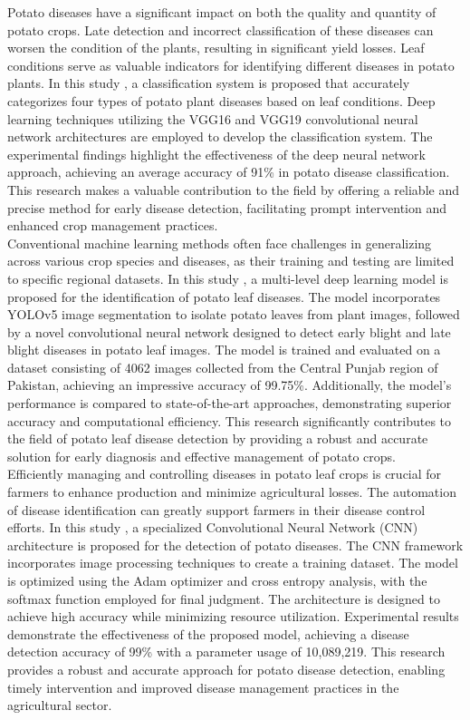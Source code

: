 \documentclass[conference]{IEEEtran}
\begin{document}
Potato diseases have a significant impact on both the quality and quantity of potato crops. Late detection and incorrect classification of these diseases can worsen the condition of the plants, resulting in significant yield losses. Leaf conditions serve as valuable indicators for identifying different diseases in potato plants. In this study \cite{9231784}, a classification system is proposed that accurately categorizes four types of potato plant diseases based on leaf conditions. Deep learning techniques utilizing the VGG16 and VGG19 convolutional neural network architectures are employed to develop the classification system. The experimental findings highlight the effectiveness of the deep neural network approach, achieving an average accuracy of 91\% in potato disease classification. This research makes a valuable contribution to the field by offering a reliable and precise method for early disease detection, facilitating prompt intervention and enhanced crop management practices.\\

Conventional machine learning methods often face challenges in generalizing across various crop species and diseases, as their training and testing are limited to specific regional datasets. In this study \cite{electronics10172064}, a multi-level deep learning model is proposed for the identification of potato leaf diseases. The model incorporates YOLOv5 image segmentation to isolate potato leaves from plant images, followed by a novel convolutional neural network designed to detect early blight and late blight diseases in potato leaf images. The model is trained and evaluated on a dataset consisting of 4062 images collected from the Central Punjab region of Pakistan, achieving an impressive accuracy of 99.75\%. Additionally, the model's performance is compared to state-of-the-art approaches, demonstrating superior accuracy and computational efficiency. This research significantly contributes to the field of potato leaf disease detection by providing a robust and accurate solution for early diagnosis and effective management of potato crops.\\

Efficiently managing and controlling diseases in potato leaf crops is crucial for farmers to enhance production and minimize agricultural losses. The automation of disease identification can greatly support farmers in their disease control efforts. In this study \cite{9181312}, a specialized Convolutional Neural Network (CNN) architecture is proposed for the detection of potato diseases. The CNN framework incorporates image processing techniques to create a training dataset. The model is optimized using the Adam optimizer and cross entropy analysis, with the softmax function employed for final judgment. The architecture is designed to achieve high accuracy while minimizing resource utilization. Experimental results demonstrate the effectiveness of the proposed model, achieving a disease detection accuracy of 99\% with a parameter usage of 10,089,219. This research provides a robust and accurate approach for potato disease detection, enabling timely intervention and improved disease management practices in the agricultural sector.\\
\end{document}
